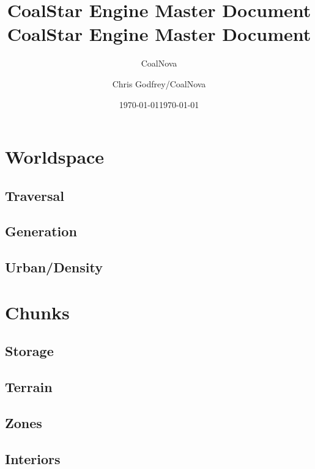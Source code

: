 \documentclass{report}
\begin{document}
\setlength{\parskip}{8pt}
\setlength{\parindent}{12pt}


\title{
    CoalStar Engine Master Document
    \linebreak 
}
\author{CoalNova}
\date{\today}

\title{CoalStar Engine Master Document}
\author{Chris Godfrey/CoalNova}
\date{\today}
\maketitle



\tableofcontents

\chapter{Worldspace}

\section{Traversal}

\section{Generation}

\section{Urban/Density}


\chapter{Chunks}

\section{Storage}

\section{Terrain}

\section{Zones}

\section{Interiors}

\end{document}
